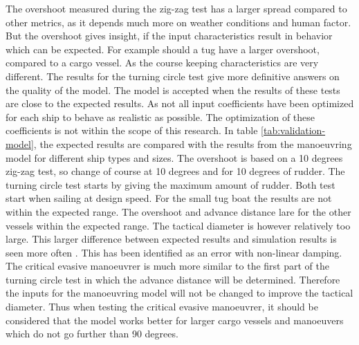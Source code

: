 The overshoot measured during the zig-zag test has a larger spread compared to other metrics, as it depends much more on weather conditions and human factor. But the overshoot gives insight, if the input characteristics result in behavior which can be expected. For example should a tug have a larger overshoot, compared to a cargo vessel. As the course keeping characteristics are very different. The results for the turning circle test give more definitive answers on the quality of the model. The model is accepted when the results of these tests are close to the expected results. As not all input coefficients have been optimized for each ship to behave as realistic as possible. The optimization of these coefficients is not within the scope of this research. In table \ref{tab:validation-model}, the expected results are compared with the results from the manoeuvring model for different ship types and sizes. The overshoot is based on a 10 degrees zig-zag test, so change of course at 10 degrees and for 10 degrees of rudder. The turning circle test starts by giving the maximum amount of rudder. Both test start when sailing at design speed. For the small tug boat the results are not within the expected range. The overshoot and advance distance lare for the other vessels within the expected range. The tactical diameter is however relatively too large. This larger difference between expected results and simulation results is seen more often \cite{Tjoswold2012}. This has been identified as an error with non-linear damping. The critical evasive manoeuvrer is much more similar to the first part of the turning circle test in which the advance distance will be determined. Therefore the inputs for the manoeuvring model will not be changed to improve the tactical diameter. 
Thus when testing the critical evasive manoeuvrer, it should be considered that the model works better for larger cargo vessels and manoeuvers which do not go further than 90 degrees.

